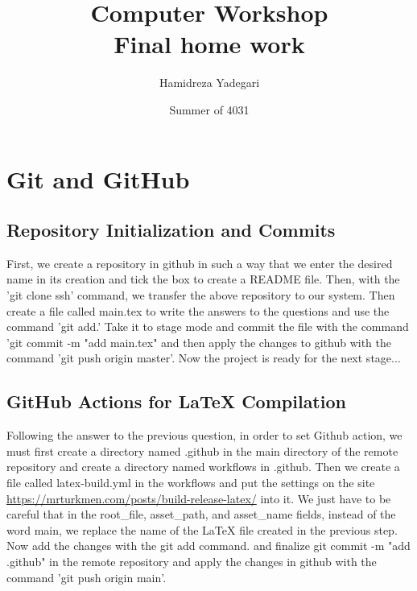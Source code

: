 \documentclass{article}
\title{Computer Workshop \\ Final home work}
\author{Hamidreza Yadegari}
\date{Summer of 4031}
\begin{document}
   \maketitle 

    \newpage
    
    \section{Git and GitHub}
        \subsection{Repository Initialization and Commits}
            First, we create a repository in github in such a way 
            that we enter the desired name in its creation and tick
             the box to create a README file. Then, with the 'git clone
              ssh' command, we transfer the above repository to our 
              system. Then create a file called main.tex to write the 
              answers to the questions and use the command 'git add.'  
              Take it to stage mode and commit the file with the command
               'git commit -m "add main.tex" and then apply the changes to 
               github with the command 'git push origin master'. Now the 
               project is ready for the next stage...

        
        \subsection{GitHub Actions for LaTeX Compilation}
        Following the answer to the previous question, in order to set Github
         action, we must first create a directory named .github in the main 
         directory of the remote repository and create a directory named workflows
          in .github. Then we create a file called latex-build.yml in the workflows
           and put the settings on the site \url{https://mrturkmen.com/posts/build-release-latex/}
            into it. We just have to be careful that in the root_file, asset_path, and asset_name
             fields, instead of the word main, we replace the name of the LaTeX file 
             created in the previous step. Now add the changes with the git add command.
              and finalize git commit -m "add .github" in the remote repository and apply
               the changes in github with the command 'git push origin main'.
\end{document}

